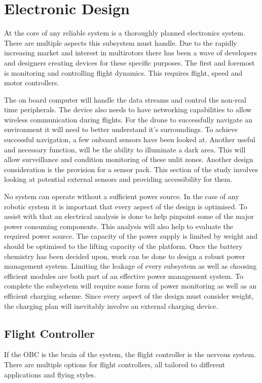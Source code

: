 \chapter{Electronic Design}

At the core of any reliable system is a thoroughly planned electronics system. There are multiple aspects this subsystem must handle. Due to the rapidly increasing market and interest in multirotors there has been a wave of developers and designers creating devices for these specific purposes. The first and foremost is monitoring and controlling flight dynamics. This requires flight, speed and motor controllers.	

The on board computer will handle the data streams and control the non-real time peripherals. The device also needs to have networking capabilities to allow wireless communication during flights. For the drone to successfully navigate an environment it will need to better understand it's surroundings. To achieve successful navigation, a few onboard sensors have been looked at. Another useful and necessary function, will be the ability to illuminate a dark area. This will allow surveillance and condition monitoring of these unlit zones. Another design consideration is the provision for a sensor pack. This section of the study involves looking at potential external sensors and providing accessibility for them.

No system can operate without a sufficient power source. In the case of any robotic system it is important that every aspect of the design is optimised. To assist with that an electrical analysis is done to help pinpoint some of the major power consuming components. This analysis will also help to evaluate the required power source. The capacity of the power supply is limited by weight and should be optimised to the lifting capacity of the platform. Once the battery chemistry has been decided upon, work can be done to design a robust power management system. Limiting the leakage of every subsystem as well as choosing efficient modules are both part of an effective power management system. To complete the subsystem will require some form of power monitoring as well as an efficient charging scheme. Since every aspect of the design must consider weight, the charging plan will inevitably involve an external charging device.
		
		\section{Flight Controller}
		If the	OBC is the brain of the system, the flight controller is the nervous system. There are multiple options for flight controllers, all tailored to different applications and flying styles.
			
